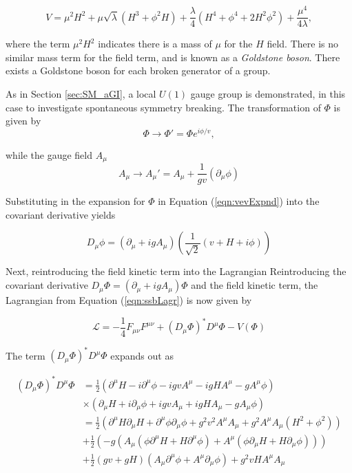 \documentclass{article}
\begin{document}
\begin{equation}
    V = \mu^2 H^2 + \mu\sqrt{\lambda}(H^3 + \phi^2 H) + \frac{\lambda}{4}(H^4 + \phi^4 + 2H^2\phi^2) + \frac{\mu^4}{4\lambda},
\end{equation}

where the term $\mu^2 H^2$ indicates there is a mass of $\mu$ for the $H$ field. There is no similar mass term for the field term, and is known as a \textit{Goldstone boson}\cite{GoldstoneTheorem}. There exists a Goldstone boson for each broken generator of a group.

As in Section \ref{sec:SM_aGI}, a local $U(1)$ gauge group is demonstrated, in this case to investigate spontaneous symmetry breaking. The transformation of $\Phi$ is given by
\begin{equation}
\Phi\rightarrow\Phi' = \Phi e^{i\phi / v},
\end{equation}

while the gauge field $A_\mu$
\begin{equation}
A_\mu \rightarrow A_\mu ' = A_\mu + \frac{1}{gv}(\partial_\mu \phi)
\end{equation}

Substituting in the expansion for $\Phi$ in Equation (\ref{eqn:vevExpnd}) into the covariant derivative yields

\begin{equation}
D_\mu\phi = \left(\partial_\mu + igA_\mu\right)\left( \frac{1}{\sqrt{2}}(v+H+i\phi)\right)
\end{equation}

Next, reintroducing the field kinetic term into the Lagrangian 
Reintroducing the covariant derivative $D_\mu \Phi = (\partial_\mu + ig A_\mu)\Phi$ and the field kinetic term, the Lagrangian from Equation (\ref{eqn:ssbLagr}) is now given by

\begin{equation}
    \mathcal{L} = -\frac{1}{4}F_{\mu\nu}F^{\mu\nu} + (D_\mu \Phi)^* D^\mu \Phi - V(\Phi)
\end{equation}

The term $(D_\mu \Phi)^* D^\mu \Phi$ expands out as

\begin{equation}
\begin{split}
(D_\mu \Phi)^* D^\mu \Phi & = \frac{1}{2}\left(\partial^\mu H - i\partial^\mu\phi - igvA^\mu - igHA^\mu - gA^\mu\phi\right) \\
&\times\left( \partial_\mu H + i\partial_\mu\phi + igvA_\mu + igHA_\mu - gA_\mu\phi \right) \\
& = \frac{1}{2}\left( \partial^\mu H \partial_\mu H + \partial^\mu\phi\partial_\mu\phi + g^2v^2A^\mu A_\mu + g^2A^\mu A_\mu(H^2 + \phi^2) \right)\\
&+\frac{1}{2}\left( -g(A_\mu(\phi\partial^\mu H + H\partial^\mu\phi) + A^\mu(\phi\partial_\mu H + H\partial_\mu\phi))\right) \\
& + \frac{1}{2}(gv+gH)(A_\mu \partial^\mu\phi + A^\mu\partial_\mu\phi) + g^2vHA^\mu A_\mu 
\end{split}
\end{equation}
\end{document}
